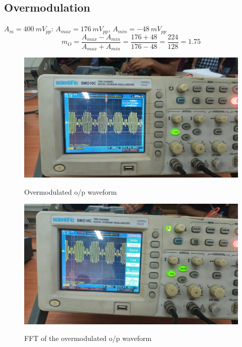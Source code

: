 \documentclass{article}
\begin{document}
\subsection{Overmodulation}
$A_m=400\ mV_{pp}$: $A_{max}=176 \ mV_{pp}$, $A_{min}=-48\ mV_{pp}$
\begin{equation}
  m_{O}=\frac{A_{max}-A_{min}}{A_{max}+A_{min}}=\frac{176+48}{176-48}=\frac{224}{128}=1.75
\end{equation}
\begin{figure}[!ht]
  \caption{Overmodulated o/p waveform}
\includegraphics[width=\textwidth]{Overmodulation.jpeg}
\label{fig:Overmodulation}
\end{figure}
\begin{figure}[!ht]
  \caption{FFT of the overmodulated o/p waveform}
\includegraphics[width=\textwidth]{Overmodulation_FFT.jpeg}
\label{fig:Overmodulation_FFT}
\end{figure}

\clearpage
\end{document}
